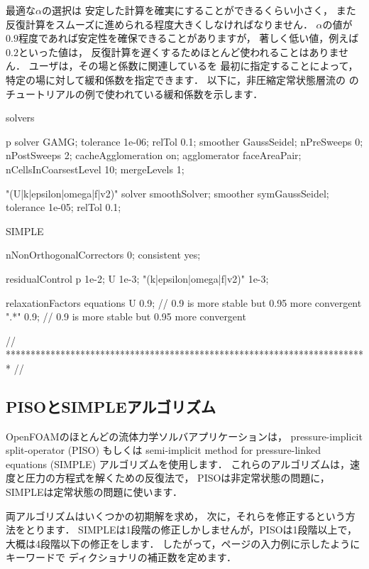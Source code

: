 最適な$\alpha$の選択は
安定した計算を確実にすることができるくらい小さく，
また反復計算をスムーズに進められる程度大きくしなければなりません．
$\alpha$の値が$0.9$程度であれば安定性を確保できることがありますが，
著しく低い値，例えば$0.2$といった値は，
反復計算を遅くするためほとんど使われることはありません．
ユーザは，その場と係数に関連しているを
最初に指定することによって，特定の場に対して緩和係数を指定できます．
以下に，非圧縮定常状態層流の
のチュートリアルの例で使われている緩和係数を示します．
\begin{OFverbatim}[file, linenum=17]

solvers
{
    p
    {
        solver          GAMG;
        tolerance       1e-06;
        relTol          0.1;
        smoother        GaussSeidel;
        nPreSweeps      0;
        nPostSweeps     2;
        cacheAgglomeration on;
        agglomerator    faceAreaPair;
        nCellsInCoarsestLevel 10;
        mergeLevels     1;
    }

    "(U|k|epsilon|omega|f|v2)"
    {
        solver          smoothSolver;
        smoother        symGaussSeidel;
        tolerance       1e-05;
        relTol          0.1;
    }
}

SIMPLE
{
    nNonOrthogonalCorrectors 0;
    consistent      yes;

    residualControl
    {
        p               1e-2;
        U               1e-3;
        "(k|epsilon|omega|f|v2)" 1e-3;
    }
}

relaxationFactors
{
    equations
    {
        U               0.9; // 0.9 is more stable but 0.95 more convergent
        ".*"            0.9; // 0.9 is more stable but 0.95 more convergent
    }
}


// ************************************************************************* //
\end{OFverbatim}


\subsection{PISOとSIMPLEアルゴリズム}
\label{ssec:4.5.3}
OpenFOAMのほとんどの流体力学ソルバアプリケーションは，
pressure-implicit split-operator (PISO) もしくは
semi-implicit method for pressure-linked equations
(SIMPLE) アルゴリズムを使用します．
これらのアルゴリズムは，速度と圧力の方程式を解くための反復法で，
PISOは非定常状態の問題に，SIMPLEは定常状態の問題に使います．

両アルゴリズムはいくつかの初期解を求め，
次に，それらを修正するという方法をとります．
SIMPLEは1段階の修正しかしませんが，PISOは1段階以上で，大概は4段階以下の修正をします．
したがって，\pageref{p:U-117}ページの入力例に示したようにキーワードで
ディクショナリの補正数を定めます．

